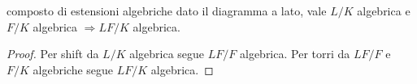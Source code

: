 \begin{minipage}{0.7\textwidth}
\begin{theorem}{composto di estensioni algebriche}
    dato il diagramma a lato, vale $L/K$ algebrica  e $F/K$ algebrica $\Rightarrow LF/K$ algebrica.
\end{theorem}
\begin{proof}
    Per shift da $L/K$ algebrica segue $LF/F$ algebrica. Per torri da $LF/F$ e $F/K$ algebriche segue $LF/K$ algebrica.
\end{proof}
\end{minipage}\hfill
\begin{minipage}{0.3\textwidth}  
\end{minipage}\hfill

